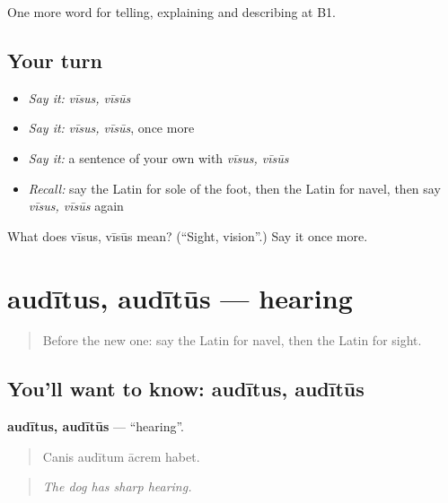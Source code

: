 \begin{grammarlens}[title={What you've built}]
One more word for telling, explaining and describing at B1.
\end{grammarlens}

\subsection*{Your turn}
\begin{itemize}
\raggedright
  \item \emph{Say it:} \emph{vīsus, vīsūs}
  \item \emph{Say it:} \emph{vīsus, vīsūs}, once more
  \item \emph{Say it:} a sentence of your own with \emph{vīsus, vīsūs}
  \item \emph{Recall:} say the Latin for sole of the foot, then the Latin for navel, then say \emph{vīsus, vīsūs} again
\end{itemize}

\begin{tcolorbox}[breakable,colback=teal!4,colframe=teal!35!black,title={Before you move on}]
What does vīsus, vīsūs mean? (\textquotedblleft{}Sight, vision\textquotedblright{}.) Say it once more.
\end{tcolorbox}
\section[audītus, audītūs]{audītus, audītūs — hearing}

\label{lesson:LA-C519-auditus}



\begin{quote}
Before the new one: say the Latin for navel, then the Latin for sight.
\end{quote}

\subsection*{You'll want to know: audītus, audītūs}
\textbf{audītus, audītūs} — \textquotedblleft{}hearing\textquotedblright{}.

\begin{quote}
Canis audītum ācrem habet.
\end{quote}

\begin{quote}
\emph{The dog has sharp hearing.}
\end{quote}


